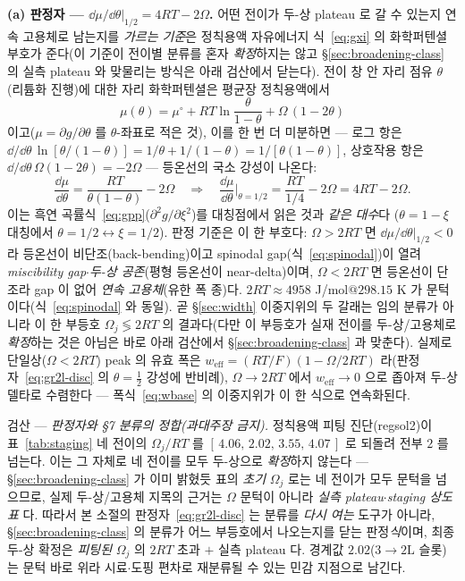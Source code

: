 \textbf{(a) 판정자 --- $\dd\mu/\dd\theta|_{1/2}=4RT-2\Omega$.} 어떤 전이가 두-상 plateau 로 갈 수 있는지 연속
고용체로 남는지를 \emph{가르는 기준}은 정칙용액 자유에너지 식~\eqref{eq:gxi} 의 화학퍼텐셜 부호가 준다(이 기준이
전이별 분류를 혼자 \emph{확정}하지는 않고 \S\ref{sec:broadening-class} 의 실측 plateau 와 맞물리는 방식은 아래
검산에서 닫는다). 전이 창 안 자리 점유 $\theta$(리튬화 진행)에
대한 자리 화학퍼텐셜은 평균장 정칙용액에서
\begin{equation}
\mu(\theta)=\mu^\circ+RT\ln\frac{\theta}{1-\theta}+\Omega\,(1-2\theta)
\label{eq:gr2l-mu}
\end{equation}
이고($\mu=\partial g/\partial\theta$ 를 $\theta$-좌표로 적은 것), 이를 한 번 더 미분하면 --- 로그 항은
$\dd/\dd\theta\,\ln[\theta/(1-\theta)]=1/\theta+1/(1-\theta)=1/[\theta(1-\theta)]$, 상호작용 항은
$\dd/\dd\theta\,\Omega(1-2\theta)=-2\Omega$ --- 등온선의 국소 강성이 나온다:
\begin{equation}
\frac{\dd\mu}{\dd\theta}=\frac{RT}{\theta(1-\theta)}-2\Omega
\quad\Longrightarrow\quad
\frac{\dd\mu}{\dd\theta}\Big|_{\theta=1/2}=\frac{RT}{1/4}-2\Omega=4RT-2\Omega.
\label{eq:gr2l-disc}
\end{equation}
이는 흑연 곡률식~\eqref{eq:gpp}($\partial^2 g/\partial\xi^2$)를 대칭점에서 읽은 것과 \emph{같은 대수}다
($\theta{=}1{-}\xi$ 대칭에서 $\theta{=}1/2\leftrightarrow\xi{=}1/2$). 판정 기준은 이 한 부호다: $\Omega>2RT$ 면
$\dd\mu/\dd\theta|_{1/2}<0$ 라 등온선이 비단조(back-bending)이고 spinodal gap(식~\eqref{eq:spinodal})이 열려
\emph{miscibility gap$\cdot$두-상 공존}(평형 등온선이 near-delta)이며, $\Omega<2RT$ 면 등온선이 단조라 gap 이 없어
\emph{연속 고용체}(유한 폭 종)다. $2RT\approx4958$ J/mol$@298.15$ K 가 문턱이다(식~\eqref{eq:spinodal} 와 동일).
곧 \S\ref{sec:width} 이중지위의 두 갈래는 임의 분류가 아니라 이 한 부등호 $\Omega_j\lessgtr2RT$ 의 결과다(다만 이
부등호가 실재 전이를 두-상/고용체로 \emph{확정}하는 것은 아님은 바로 아래 검산에서 \S\ref{sec:broadening-class}
과 맞춘다). 실제로
단일상($\Omega<2RT$) peak 의 유효 폭은 $w_\mathrm{eff}=(RT/F)(1-\Omega/2RT)$ 라(판정자~\eqref{eq:gr2l-disc} 의
$\theta{=}\tfrac12$ 강성에 반비례), $\Omega\!\to\!2RT$ 에서 $w_\mathrm{eff}\!\to\!0$ 으로 좁아져 두-상 델타로
수렴한다 --- 폭식~\eqref{eq:wbase} 의 이중지위가 이 한 식으로 연속화된다.

\begin{verifybox}
검산 --- \emph{판정자와 §7 분류의 정합(과대주장 금지).} 정칙용액 피팅 진단(regsol2)이 표~\ref{tab:staging}
네 전이의 $\Omega_j/RT$ 를 $[\,4.06,\,2.02,\,3.55,\,4.07\,]$ 로 되돌려 전부 $2$ 를 넘는다. 이는 그 자체로 네
전이를 모두 두-상으로 \emph{확정}하지 않는다 --- \S\ref{sec:broadening-class} 가 이미 밝혔듯 표의 \emph{초기}
$\Omega_j$ 로는 네 전이가 모두 문턱을 넘으므로, 실제 두-상/고용체 지목의 근거는 $\Omega$ 문턱이 아니라
\emph{실측 plateau$\cdot$staging 상도표}\cite{dahn1991,ohzuku1993} 다. 따라서 본 소절의 판정자~\eqref{eq:gr2l-disc}
는 분류를 \emph{다시 여는} 도구가 아니라, \S\ref{sec:broadening-class} 의 분류가 어느 부등호에서 나오는지를
닫는 판정\emph{식}이며, 최종 두-상 확정은 \emph{피팅된} $\Omega_j$ 의 $2RT$ 초과 $+$ 실측 plateau 다. 경계값
$2.02$($3\!\to\!2\mathrm L$ 슬롯)는 문턱 바로 위라 시료$\cdot$도핑 편차로 재분류될 수 있는 민감 지점으로 남긴다.
\end{verifybox}

